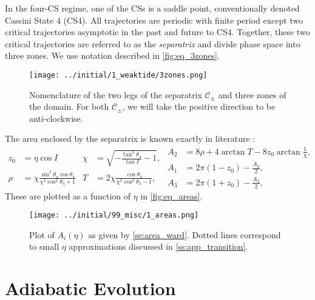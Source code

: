 \documentclass[
        fleqn,
        usenatbib,
    ]{mnras}
\newcommand*{\p}[1]{\left(#1\right)}
\begin{document}
In the four-CS regime, one of the CSs is a saddle point, conventionally denoted
Cassini State 4 (CS4). All trajectories are periodic with finite period except
two critical trajectories asymptotic in the past and future to CS4. Together,
these two critical trajectories are referred to as the \emph{separatrix} and
divide phase space into three zones. We use notation described in
\autoref{fig:eq_3zones}.
\begin{figure}
    \centering
    \texttt{[image: ../initial/1\_weaktide/3zones.png]}
    \caption{Nomenclature of the two legs of the separatrix $\mathcal{C}_{\pm}$
    and three zones of the domain. For both $\mathcal{C}_{\pm}$, we will take
    the positive direction to be anti-clockwise.}\label{fig:eq_3zones}
\end{figure}

The area enclosed by the separatrix is known exactly in literature
\citep{henrard1987,ward2004I}:
\begin{subequations}\label{se:area_ward}
    \begin{align*}
        z_0 &= \eta\cos I &
        \chi &= \sqrt{-\frac{\tan^3\theta_4}{\tan I} - 1},\\
        \rho &= \chi \frac{\sin^2 \theta_4\cos \theta_4}{
            \chi^2 \cos^2\theta_4 + 1} &
        T &= 2\chi \frac{\cos \theta_4}{
            \chi^2 \cos^2\theta_4 - 1},
    \end{align*}
    \begin{align}
        A_2 &= 8\rho + 4\arctan T - 8z_0 \arctan \frac{1}{\chi},\\
        A_1 &= 2\pi\p{1 - z_0} - \frac{A_2}{2},\\
        A_3 &= 2\pi\p{1 + z_0} - \frac{A_2}{2}.
    \end{align}
\end{subequations}
These are plotted as a function of $\eta$ in \autoref{fig:eq_areas}.
\begin{figure}
    \centering
    \texttt{[image: ../initial/99\_misc/1\_areas.png]}
    \caption{Plot of $A_{i}(\eta)$ as given by \autoref{se:area_ward}. Dotted
    lines correspond to small $\eta$ approximations discussed in
    \autoref{ss:app_transition}.}\label{fig:eq_areas}
\end{figure}

\section{Adiabatic Evolution}\label{s:ad}
\end{document}
